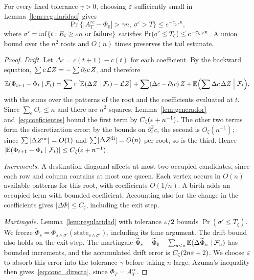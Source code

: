 \begin{lema}\label{lem:conc_directa} For every fixed tolerance $\gamma>0$,
choosing $\varepsilon$ sufficiently
small in Lemma~\ref{lem:regularidad} gives \begin{equation}\label{eq:conc_directa}
 \Pr\bigl\{|A_T^{rc}-\Phi_0|>\gamma n,\ \sigma'>T\bigr\}\le e^{-c_{\zeta,\gamma}n},
\end{equation} where $\sigma'=\inf\{t:E_t\ge\varepsilon n\text{ or failure}\}$ satisfies
$\Pr(\sigma'\le T_\zeta)\le
e^{-c_{\zeta,\varepsilon}n}$. A union bound over the $n^2$ roots and $O(n)$ times preserves the tail estimate.
\end{lema}

\begin{proof} \emph{Drift.} Let $\Delta c=c(t+1)-c(t)$ for each coefficient. By the backward equation,
$\sum c\,\mathcal{L} Z=-\sum\partial_tc\,Z$, and therefore \[
 \mathbb{E}(\Phi_{t+1}-\Phi_t\mid\mathcal F_t)=\sum c\,\bigl[\mathbb{E}(\Delta Z\mid\mathcal F_t)-\mathcal{L} Z\bigr]
 +\sum(\Delta c-\partial_tc)\,Z+\mathbb{E}\Bigl(\sum\Delta c\,\Delta Z\Bigm|\mathcal F_t\Bigr),
\] with the sums over the patterns of the root and the coefficients evaluated at $t$. Since $\sum_eO_e\le n$
and there are $n^2$
squares, Lemma~\ref{lem:generador} and~\eqref{eq:coeficientes} bound the first term by
$C_\zeta(\varepsilon+n^{-1})$. The other two terms
form the discretization error: by the bounds on $\partial_t^2c$, the second is $O_\zeta(n^{-1})$; since
$\sum|\Delta Z^{\mathrm{oc}}|=O(1)$
and $\sum|\Delta Z^{\mathrm{di}}|=O(n)$ per root, so is the third. Hence
$|\mathbb{E}(\Phi_{t+1}-\Phi_t\mid\mathcal F_t)|\le C_\zeta(\varepsilon+n^{-1})$.

\emph{Increments.} A destination diagonal affects at most two occupied candidates, since each row and column
contains at most one queen.
Each vertex occurs in $O(n)$ available patterns for this root, with coefficients $O(1/n)$. A birth adds an
occupied term with bounded
coefficient. Accounting also for the change in the coefficients gives $|\Delta\Phi|\le C_\zeta$, including
the exit step.

\emph{Martingale.} Lemma~\ref{lem:regularidad} with tolerance $\varepsilon/2$ bounds $\Pr(\sigma'\le T_\zeta)$. We
freeze
$\widetilde\Phi_s=\Phi_{s\wedge\sigma'}(\text{state}_{s\wedge\sigma'})$, including its time argument. The
drift bound also holds on the
exit step. The martingale
$\widetilde\Phi_s-\widetilde\Phi_0-\sum_{u<s}\mathbb{E}(\Delta\widetilde\Phi_u\mid\mathcal F_u)$ has bounded
increments, and the accumulated drift error is $C_\zeta(2n\varepsilon+2)$. We choose $\varepsilon$ to absorb this error
into the tolerance $\gamma$
before taking $n$ large. Azuma's inequality then gives~\eqref{eq:conc_directa}, since $\Phi_T=A_T^{rc}$.
\end{proof}

